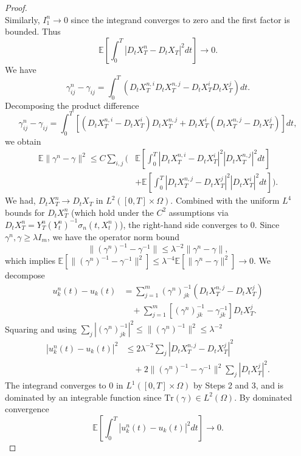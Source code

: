 \documentclass[10pt,a4paper]{amsart}
\begin{document}
\begin{proof}
\[\]
Similarly, \(I_1^n \to 0\) since the integrand converges to zero and the first factor is bounded. Thus
\[
\mathbb{E}\left[\int_0^T |D_t X_T^n - D_t X_T|^2 dt\right] \to 0.
\]
%
We have
\[
\gamma^n_{ij} - \gamma_{ij} = \int_0^T (D_t X_T^{n,i} D_t X_T^{n,j} - D_t X_T^i D_t X_T^j) dt.
\]
Decomposing the product difference
\[
\gamma^n_{ij} - \gamma_{ij} = \int_0^T \left[(D_t X_T^{n,i} - D_t X_T^i)D_t X_T^{n,j} + D_t X_T^i(D_t X_T^{n,j} - D_t X_T^j)\right] dt,
\]
we obtain
\begin{align*}
\mathbb{E}\|\gamma^n - \gamma\|^2 \leq C \sum_{i,j} \bigg( &\mathbb{E}\left[\int_0^T |D_t X_T^{n,i} - D_t X_T^i|^2 |D_t X_T^{n,j}|^2 dt\right] \\
&+ \mathbb{E}\left[\int_0^T |D_t X_T^{n,j} - D_t X_T^j|^2 |D_t X_T^i|^2 dt\right] \bigg).
\end{align*}
We had, \(D_t X_T^n \to D_t X_T\) in \(L^2([0,T] \times \Omega)\). Combined with the uniform \(L^4\) bounds for \(D_t X_T^n\) (which hold under the \(C^2\) assumptions via \(D_t X_T^n = Y_T^n(Y_t^n)^{-1}\sigma_n(t,X_t^n)\)), the right-hand side converges to 0.
%
Since \(\gamma^n, \gamma \geq \lambda I_m\), we have the operator norm bound
\[
\|(\gamma^n)^{-1} - \gamma^{-1}\| \leq \lambda^{-2} \|\gamma^n - \gamma\|,
\]
which implies \(\mathbb{E}[\|(\gamma^n)^{-1} - \gamma^{-1}\|^2] \leq \lambda^{-4} \mathbb{E}[\|\gamma^n - \gamma\|^2] \to 0\).
%
We decompose
\begin{align*}
u_k^n(t) - u_k(t) &= \sum_{j=1}^m (\gamma^n)^{-1}_{jk} (D_t X_T^{n,j} - D_t X_T^j) \\
&\quad + \sum_{j=1}^m [(\gamma^n)^{-1}_{jk} - \gamma^{-1}_{jk}] D_t X_T^j.
\end{align*}
%
Squaring and using \(\sum_j |(\gamma^n)^{-1}_{jk}|^2 \leq \|(\gamma^n)^{-1}\|^2 \leq \lambda^{-2}\)
\begin{align*}
|u_k^n(t) - u_k(t)|^2 &\leq 2\lambda^{-2} \sum_j |D_t X_T^{n,j} - D_t X_T^j|^2 \\
&\quad + 2\|(\gamma^n)^{-1} - \gamma^{-1}\|^2 \sum_j |D_t X_T^j|^2.
\end{align*}
%
The integrand converges to 0 in \(L^1([0,T] \times \Omega)\) by Steps 2 and 3, and is dominated by an integrable function since \(\mathrm{Tr}(\gamma) \in L^2(\Omega)\). By dominated convergence
\[
\mathbb{E}\left[\int_0^T |u_k^n(t) - u_k(t)|^2 dt\right] \to 0. 
\]

\end{proof}
\end{document}
